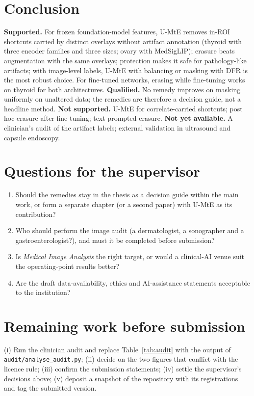 \section{Conclusion}
\textbf{Supported.} For frozen foundation-model features, U-MtE removes in-ROI shortcuts carried by distinct overlays
without artifact annotation (thyroid with three encoder families and three sizes; ovary with MedSigLIP); erasure beats
augmentation with the same overlays; protection makes it safe for pathology-like artifacts; with image-level labels, U-MtE
with balancing or masking with DFR is the most robust choice. For fine-tuned networks, erasing while fine-tuning works on
thyroid for both architectures. \textbf{Qualified.} No remedy improves on masking uniformly on unaltered data; the remedies
are therefore a decision guide, not a headline method. \textbf{Not supported.} U-MtE for correlate-carried shortcuts;
post hoc erasure after fine-tuning; text-prompted erasure. \textbf{Not yet available.} A clinician's audit of the artifact
labels; external validation in ultrasound and capsule endoscopy.

\section{Questions for the supervisor}
\begin{enumerate}\itemsep1pt
\item Should the remedies stay in the thesis as a decision guide within the main work, or form a separate chapter (or a
second paper) with U-MtE as its contribution?
\item Who should perform the image audit (a dermatologist, a sonographer and a gastroenterologist?), and must it be
completed before submission?
\item Is \emph{Medical Image Analysis} the right target, or would a clinical-AI venue suit the operating-point results better?
\item Are the draft data-availability, ethics and AI-assistance statements acceptable to the institution?
\end{enumerate}

\section{Remaining work before submission}
(i) Run the clinician audit and replace Table~\ref{tab:audit} with the output of \texttt{audit/analyse\_audit.py};
(ii) decide on the two figures that conflict with the licence rule; (iii) confirm the submission statements; (iv) settle
the supervisor's decisions above; (v) deposit a snapshot of the repository with its registrations and tag the submitted
version.




